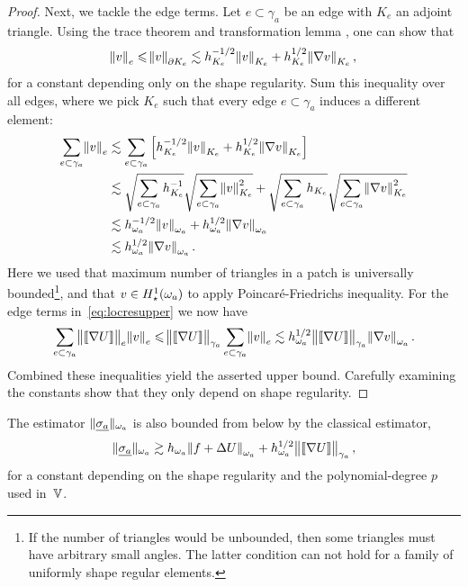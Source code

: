 \documentclass[thesis.tex]{subfiles}
\begin{document}
\begin{proof}
  Next, we tackle the edge terms. Let $e \subset \gamma_a$ be an edge with $K_e$ an adjoint triangle.
  Using the trace theorem and transformation lemma \cite[Lem~1.2]{stevenson}, one can show that
  \[ 
    \norm{v}_e \leqslant \norm{v}_{\partial K_e} \lesssim h_{K_e}^{-1/2} \norm{v}_{K_e} + h_{K_e}^{1/2} \norm{\nabla v}_{K_e},
  \]
  for a constant depending only on the shape regularity. 
  Sum this inequality over all edges, where we pick  $K_e$ such that every edge $e \subset \gamma_a$ induces
  a different element: 
  \begin{align*}
    \sum_{e \subset \gamma_a} \norm{v}_e&\lesssim\sum_{e\subset \gamma_a} \left[ h_{K_e}^{-1/2} \norm{v}_{K_e} +  h_{K_e}^{1/2} \norm{\nabla v}_{K_e} \right]\\
    &\lesssim \sqrt{\sum_{e \subset \gamma_a} h_{K_e}^{-1}} \sqrt{\sum_{e\subset \gamma_a} \norm{v}_{K_e}^2} 
    + \sqrt{\sum_{e \subset \gamma_a} h_{K_e}} \sqrt{\sum_{e \subset \gamma_a} \norm{\nabla v}_{K_e}^2}\\
    &\lesssim h_{\omega_a}^{-1/2} \norm{v}_{\omega_a} + h_{\omega_a}^{1/2} \norm{\nabla v}_{\omega_a} \\
    &\lesssim h_{\omega_a}^{1/2} \norm{\nabla v}_{\omega_a}.
  \end{align*}
  Here we used that maximum number of triangles in a patch is universally bounded\footnote{If the number of triangles would be unbounded, then some triangles must have arbitrary small angles. The latter condition can not hold for a family of uniformly shape regular elements.}, and that $v \in H_\star^1(\omega_a)$ to apply 
  Poincar\'e-Friedrichs inequality. For the edge terms in~\eqref{eq:locresupper} we now have
  \[
    \sum_{e \subset \gamma_a} \norm{ \llbracket \nabla U \rrbracket}_e \norm{v}_e \leqslant \norm{\llbracket \nabla U \rrbracket}_{\gamma_a} \sum_{e \subset \gamma_a} \norm{v}_e \lesssim h_{\omega_a}^{1/2} \norm{\llbracket \nabla U \rrbracket}_{\gamma_a}  \norm{\nabla v}_{\omega_a}. 
  \]
  Combined these inequalities yield the asserted upper bound. Carefully examining the constants show that
  they only depend on shape regularity.
  \end{proof}
  \begin{lem}
    \label{lem:clasequivlow}
  The estimator $\| \underline{\sigma_a} \|_{\omega_a}$ is also bounded from below by the classical estimator,
  \[
    \| \underline{\sigma_a} \|_{\omega_a} \gtrsim h_{\omega_a}\norm{f + \Delta U}_{\omega_a} + h^{1/2}_{\omega_a} \norm{\llbracket \nabla U  \rrbracket}_{\gamma_a},
  \]
  for a constant depending on the shape regularity and the polynomial-degree $p$ used in~$\mathbb{V}$.
  \end{lem}
\end{document}
